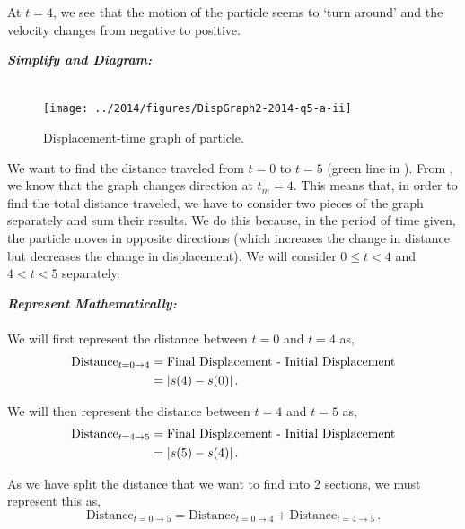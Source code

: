 \begin{subquestions}
\begin{subsubquestions}
At $t=4$, we see that the motion of the particle seems to `turn around' and the velocity changes from negative to positive. 


\subsubquestion

\begin{subsubsubquestions}
	
\subsubsubquestion

\textbf{\textit{Simplify and Diagram:}} \\ \\

\begin{figure}[H]
	\begin{center}
		\texttt{[image: ../2014/figures/DispGraph2-2014-q5-a-ii]}
		\caption{\label{2014:q5:SGraph2} Displacement-time graph of particle.}
	\end{center}
\end{figure}

We want to find the distance traveled from $t=0$ to $t=5$ (green line in ). From , we know that the graph changes direction at $t_m=4$. This means that, in order to find the total distance traveled, we have to consider two pieces of the graph separately and sum their results. We do this because, in the period of time given, the particle moves in opposite directions (which increases the change in distance but decreases the change in displacement). We will consider $0 \leq t < 4$ and $4 < t < 5$ separately.


\textbf{\textit{Represent Mathematically:}} \\ \\
We will first represent the distance between $t=0$ and $t=4$ as,
\begin{align}
	\text{Distance}_{t=0 \rightarrow 4} & = \text{Final Displacement - Initial Displacement} \nonumber \\
							& = |s(4)-s(0)| \,.  \label{2014:q5:Seqn1}
\end{align}

We will then represent the distance between $t=4$ and $t=5$ as,
\begin{align}
	\text{Distance}_{t=4 \rightarrow 5} & = \text{Final Displacement - Initial Displacement} \nonumber \\
	& = |s(5)-s(4)| \,.  \label{2014:q5:Seqn2}
\end{align}

As we have split the distance that we want to find into 2 sections, we must represent this as,
\begin{equation}
	\text{Distance}_{t=0 \rightarrow 5} = \text{Distance}_{t=0 \rightarrow 4} + \text{Distance}_{t=4 \rightarrow 5} \,. \label{2014:q5:Seqn3}
\end{equation}


\end{subsubsubquestions}
\end{subsubquestions}
\end{subquestions}
